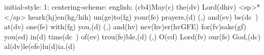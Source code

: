 initial-style: 1;
centering-scheme: english;
(cb4)May(c) the(dv) Lord(dhiv) <sp>*</sp> heark(hj)en(hg/hih) un(ge)to(fg) your(fe) prayers,(d) (,) and(ev) be(dc~) at(dv) one(fe) with(fg) you,(d) (,) and(hv) nev(hv)er(hvGFE) for(fv)sake(gf) you(ed) in(d) time(dc~) of(ev) trou(fe)ble,(d) (,) O(cd) Lord(fv) our(fe) God,(dc) al(dv)le(efe)lu(d)ia.(d)

